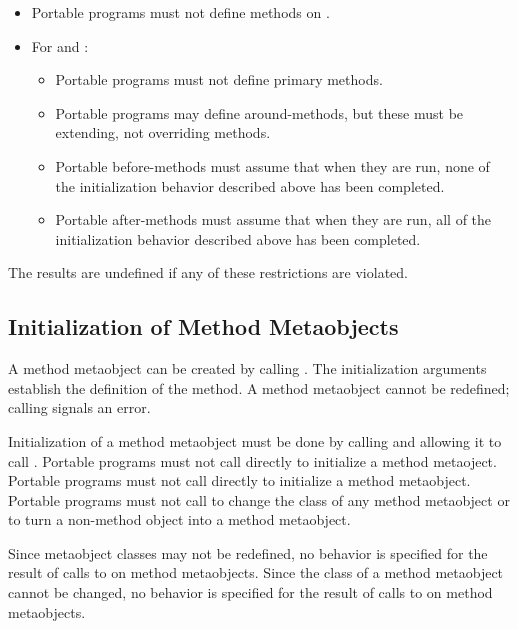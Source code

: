\begin{itemize}
\item 
  Portable programs must not define methods on .
\item 
  For  and :
  \begin{itemize}
  \item 
    Portable programs must not define primary methods.
  \item 
    Portable programs may define around-methods, but these must be extending, not overriding methods.
  \item 
    Portable before-methods must assume that when they are run, none of the
    initialization behavior described above has been completed. 
  \item 
    Portable after-methods must assume that when they are run, all of the
    initialization behavior described above has been completed. 
  \end{itemize}
\end{itemize}

The results are undefined if any of these restrictions are violated.

\subsection{Initialization of Method Metaobjects}

A method metaobject can be created by calling . The initialization
arguments establish the definition of the method. A method metaobject cannot be
redefined; calling  signals an error. 

Initialization of a method metaobject must be done by calling
 and allowing it to call . Portable
programs must not call  directly to initialize a method
metaoject. Portable programs must not call  directly to
initialize a method metaobject. Portable programs must not call
 to change the class of any method metaobject or to turn a
non-method object into a method metaobject.

Since metaobject classes may not be redefined, no behavior is specified for the
result of calls to  on method
metaobjects. Since the class of a method metaobject cannot be changed, no
behavior is specified for the result of calls to
 on method metaobjects.

